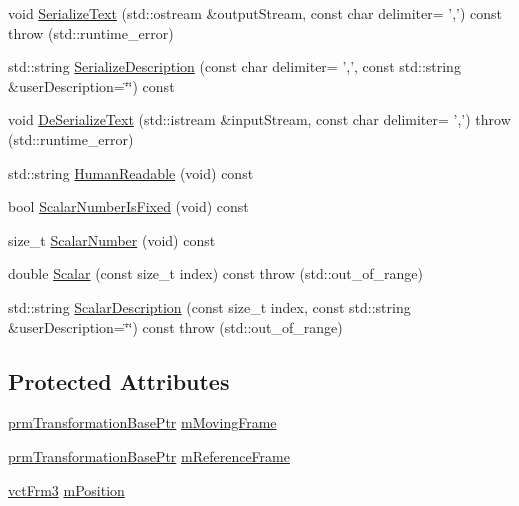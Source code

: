 \begin{DoxyCompactItemize}
\item 
void \hyperlink{classprm_position_cartesian_get_aa2b500c82ad5a3a65a095763b211a490}{Serialize\-Text} (std\-::ostream \&output\-Stream, const char delimiter= ',') const   throw (std\-::runtime\-\_\-error)
\item 
std\-::string \hyperlink{classprm_position_cartesian_get_a49d143acebdb99bdee40533a921a3de6}{Serialize\-Description} (const char delimiter= ',', const std\-::string \&user\-Description=\char`\"{}\char`\"{}) const 
\item 
void \hyperlink{classprm_position_cartesian_get_ab707eeb5d7002b67ca6601fbcae98174}{De\-Serialize\-Text} (std\-::istream \&input\-Stream, const char delimiter= ',')  throw (std\-::runtime\-\_\-error)
\item 
std\-::string \hyperlink{classprm_position_cartesian_get_a1a4ca372a09cd8220207215a33122c0f}{Human\-Readable} (void) const 
\item 
bool \hyperlink{classprm_position_cartesian_get_aec2aa7c72969c0afb623e6857d8de58a}{Scalar\-Number\-Is\-Fixed} (void) const 
\item 
size\-\_\-t \hyperlink{classprm_position_cartesian_get_a29846aae8d98171d25618628192aceda}{Scalar\-Number} (void) const 
\item 
double \hyperlink{classprm_position_cartesian_get_a0efd97a9d97682f5dd6ca9319608be88}{Scalar} (const size\-\_\-t index) const   throw (std\-::out\-\_\-of\-\_\-range)
\item 
std\-::string \hyperlink{classprm_position_cartesian_get_ac0c28dc368255ab642480434d2b28483}{Scalar\-Description} (const size\-\_\-t index, const std\-::string \&user\-Description=\char`\"{}\char`\"{}) const   throw (std\-::out\-\_\-of\-\_\-range)
\end{DoxyCompactItemize}
\subsection*{Protected Attributes}
\begin{DoxyCompactItemize}
\item 
\hyperlink{prm_transformation_base_8h_a881a6a7d2191474974cdf36d79e1df08}{prm\-Transformation\-Base\-Ptr} \hyperlink{classprm_position_cartesian_get_a01778edc80fb05f525a61afd47753631}{m\-Moving\-Frame}
\item 
\hyperlink{prm_transformation_base_8h_a881a6a7d2191474974cdf36d79e1df08}{prm\-Transformation\-Base\-Ptr} \hyperlink{classprm_position_cartesian_get_a64e672cde3d04a727f394fc97dc455ed}{m\-Reference\-Frame}
\item 
\hyperlink{vct_transformation_types_8h_a81feda0a02c2d1bc26e5553f409fed20}{vct\-Frm3} \hyperlink{classprm_position_cartesian_get_ac1033fd1dd058ef3976c5161a483fa92}{m\-Position}
\end{DoxyCompactItemize}


